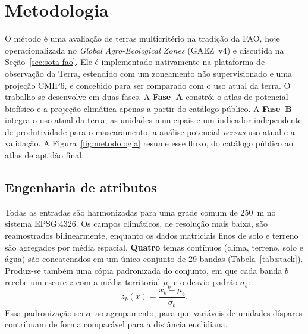\chapter{Metodologia}\label{ch:method}

O método é uma avaliação de terras multicritério na tradição da FAO, hoje operacionalizada no
\emph{Global Agro-Ecological Zones} (GAEZ~v4) \citep[p.~1]{fischer_global_2021} e discutida na
Seção~\ref{sec:sota-fao}. Ele é implementado nativamente na plataforma de observação da Terra, estendido
com um zoneamento não supervisionado e uma projeção CMIP6, e concebido para ser comparado com o uso
atual da terra. O trabalho se desenvolve em duas fases. A \textbf{Fase~A} constrói o atlas de potencial
biofísico e a projeção climática apenas a partir do catálogo público. A \textbf{Fase~B} integra o uso
atual da terra, as unidades municipais e um indicador independente de produtividade para o
mascaramento, a análise potencial \emph{versus} uso atual e a validação. A Figura~\ref{fig:metodologia}
resume esse fluxo, do catálogo público ao atlas de aptidão final.


\section{Engenharia de atributos}\label{sec:feature-eng}

Todas as entradas são harmonizadas para uma grade comum de 250~m no sistema EPSG:4326. Os campos
climáticos, de resolução mais baixa, são reamostrados bilinearmente, enquanto os dados matriciais finos
de solo e terreno são agregados por média espacial. \textbf{Quatro} temas contínuos (clima, terreno,
solo e água) são concatenados em um único conjunto de 29 bandas (Tabela~\ref{tab:stack}). Produz-se
também uma cópia padronizada do conjunto, em que cada banda $b$ recebe um escore $z$ com a
média territorial $\mu_b$ e o desvio-padrão $\sigma_b$:
\begin{equation*}
  z_b(x) = \frac{x_b - \mu_b}{\sigma_b}.
\end{equation*}
Essa padronização serve ao agrupamento, para que variáveis de unidades díspares contribuam de forma
comparável para a distância euclidiana.

